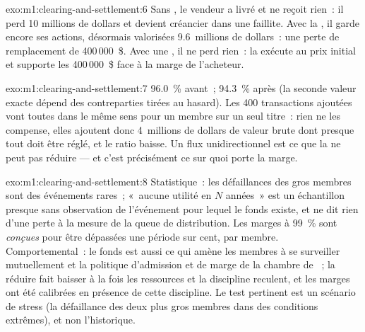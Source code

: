 \begin{solution}{exo:m1:clearing-and-settlement:6}
Sans , le vendeur a livré et ne reçoit rien~: il perd 10
millions de dollars et devient créancier dans une faillite. Avec la , il garde encore ses
actions, désormais valorisées 9.6~millions de dollars~: une perte de remplacement de 400\,000~\$. Avec une
, il ne perd rien~: la  exécute au prix initial et
supporte les 400\,000~\$ face à la marge de l'acheteur.
\end{solution}

\begin{solution}{exo:m1:clearing-and-settlement:7}
96.0~\% avant~; 94.3~\% après (la seconde valeur exacte dépend des contreparties
tirées au hasard). Les 400 transactions ajoutées vont toutes dans le même sens pour un
membre sur un seul titre~: rien ne les compense, elles ajoutent donc 4~millions de dollars de valeur brute dont presque tout
doit être réglé, et le ratio baisse. Un flux unidirectionnel est ce que la  ne
peut pas réduire --- et c'est précisément ce sur quoi porte la marge.
\end{solution}

\begin{solution}{exo:m1:clearing-and-settlement:8}
Statistique~: les défaillances des gros membres sont des événements rares~; «~aucune utilité en $N$
années~» est un échantillon presque sans observation de l'événement pour lequel le fonds existe,
et ne dit rien d'une perte à la mesure de la queue de distribution. Les marges à 99~\% sont
\emph{conçues} pour être dépassées une période sur cent, par membre.
Comportemental~: le fonds est aussi ce qui amène les membres à se surveiller mutuellement et
la politique d'admission et de marge de la chambre de ~; la réduire fait baisser à la fois
les ressources et la discipline reculent, et les marges ont été calibrées en
présence de cette discipline. Le test pertinent est un scénario de stress (la
défaillance des deux plus gros membres dans des conditions extrêmes), et non l'historique.
\end{solution}

